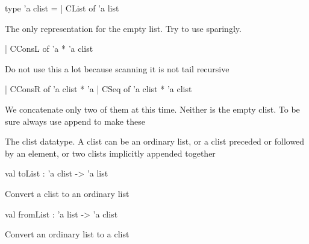 \documentclass[11pt]{article}
\begin{document}
\ocamldocvspace{0.5cm}



\label{type:Clist.clist}\begin{ocamldoccode}
type 'a clist =
  | CList of 'a list
\end{ocamldoccode}
\begin{ocamldoccomment}
The only representation for the empty 
                                     list. Try to use sparingly.
\end{ocamldoccomment}
\begin{ocamldoccode}
  | CConsL of 'a * 'a clist
\end{ocamldoccode}
\begin{ocamldoccomment}
Do not use this a lot because scanning 
 it is not tail recursive
\end{ocamldoccomment}
\begin{ocamldoccode}
  | CConsR of 'a clist * 'a
  | CSeq of 'a clist * 'a clist
\end{ocamldoccode}
\begin{ocamldoccomment}
We concatenate only two of them at this
                                    time. Neither is the empty clist. To be
                                    sure always use append to make these
\end{ocamldoccomment}
\begin{ocamldocdescription}
The clist datatype. A clist can be an ordinary list, or a clist preceded 
    or followed by an element, or two clists implicitly appended together


\end{ocamldocdescription}




\label{val:Clist.toList}\begin{ocamldoccode}
val toList : 'a clist -> 'a list
\end{ocamldoccode}
\begin{ocamldocdescription}
Convert a clist to an ordinary list


\end{ocamldocdescription}




\label{val:Clist.fromList}\begin{ocamldoccode}
val fromList : 'a list -> 'a clist
\end{ocamldoccode}
\begin{ocamldocdescription}
Convert an ordinary list to a clist


\end{ocamldocdescription}
\end{document}
